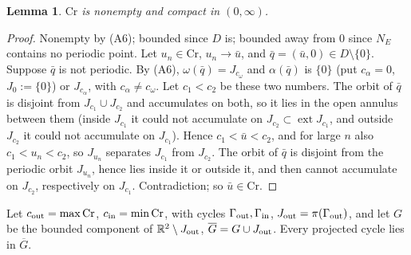 \documentclass[11pt,a4paper]{article}
\numberwithin{equation}{section}
\newtheorem{lemma}[theorem]{Lemma}
\theoremstyle{remark}\newtheorem{remark}[theorem]{Remark}
\newcommand{\R}{\mathbb R}
\begin{document}
\begin{lemma}\label{lem:crests}
$\mathrm{Cr}$ is nonempty and compact in $(0,\infty)$.
\end{lemma}
\begin{proof}
Nonempty by (A6); bounded since $D$ is; bounded away from $0$ since $N_E$ contains no periodic point. Let
$u_n\in\mathrm{Cr}$, $u_n\to\bar u$, and $\bar q=(\bar u,0)\in D\setminus\{0\}$. Suppose $\bar q$ is not periodic. By
(A6), $\omega(\bar q)=J_{c_\omega}$ and $\alpha(\bar q)$ is $\{0\}$ (put $c_\alpha=0$, $J_0:=\{0\}$) or
$J_{c_\alpha}$, with $c_\alpha\ne c_\omega$. Let $c_1<c_2$ be these two numbers. The orbit of $\bar q$ is disjoint
from $J_{c_1}\cup J_{c_2}$ and accumulates on both, so it lies in the open annulus between them (inside $J_{c_1}$ it
could not accumulate on $J_{c_2}\subset\operatorname{ext}J_{c_1}$, and outside $J_{c_2}$ it could not accumulate on
$J_{c_1}$). Hence $c_1<\bar u<c_2$, and for large $n$ also $c_1<u_n<c_2$, so $J_{u_n}$ separates $J_{c_1}$ from
$J_{c_2}$. The orbit of $\bar q$ is disjoint from the periodic orbit $J_{u_n}$, hence lies inside it or outside it,
and then cannot accumulate on $J_{c_2}$, respectively on $J_{c_1}$. Contradiction; so $\bar u\in\mathrm{Cr}$.
\end{proof}
Let $c_{\rm out}=\max\mathrm{Cr}$, $c_{\rm in}=\min\mathrm{Cr}$, with cycles $\Gamma_{\rm out},\Gamma_{\rm in}$,
$J_{\rm out}=\pi(\Gamma_{\rm out})$, and let $G$ be the bounded component of $\R^2\setminus J_{\rm out}$,
$\overline G=G\cup J_{\rm out}$. Every projected cycle lies in $\overline G$.
\end{document}
